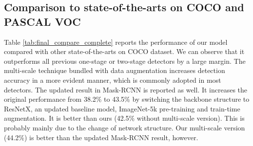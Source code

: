 \documentclass{article} \usepackage{iclr2019_conference,times}
\begin{document}
\subsection{Comparison to state-of-the-arts on COCO and PASCAL VOC}

Table \ref{tab:final_compare_complete} reports the performance of our model compared with other state-of-the-arts on COCO dataset. We can observe that it outperforms all previous one-stage or two-stage detectors by a large margin. 
The multi-scale technique bundled with data augmentation increases detection accuracy 
in a more evident manner, which is commonly adopted in most detectors. 
{
The updated result in Mask-RCNN is reported as well. It increases the original performance from 38.2\% to 43.5\%
by switching the backbone structure to ResNetX, an updated baseline model, ImageNet-5k pre-training and train-time augmentation. It is better than ours (42.5\% without multi-scale version). This is probably mainly due to the change of network structure. Our multi-scale version (44.2\%) is better than the updated Mask-RCNN result, however.}
\end{document}
